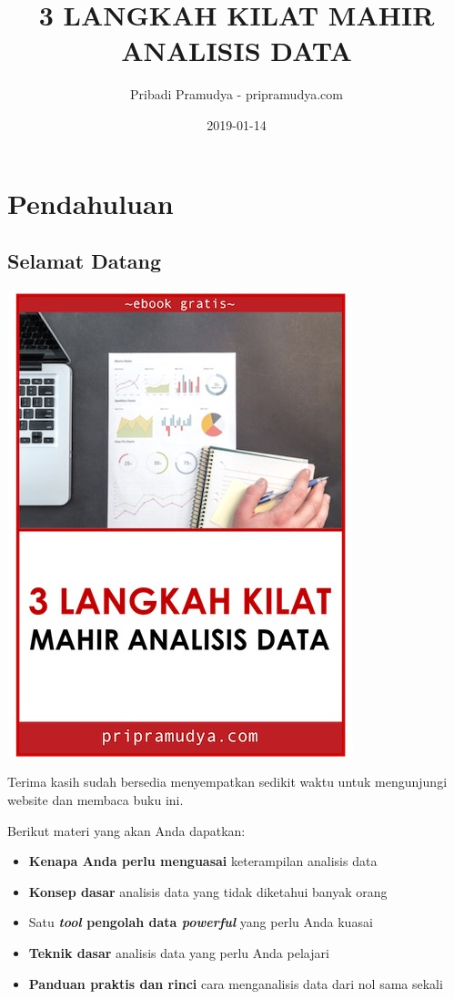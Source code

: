 \documentclass[openany]{book}
\title{3 LANGKAH KILAT MAHIR ANALISIS DATA}
\author{Pribadi Pramudya - pripramudya.com}
\date{2019-01-14}
\providecommand{\tightlist}{%
  \setlength{\itemsep}{0pt}\setlength{\parskip}{0pt}}
\begin{document}
\maketitle

{
\setcounter{tocdepth}{1}
\tableofcontents
}
\chapter*{Pendahuluan}\label{pendahuluan}

\section*{Selamat Datang}\label{selamat-datang}

\begin{center}\includegraphics[width=0.75\linewidth]{images/ebook} \end{center}

Terima kasih sudah bersedia menyempatkan sedikit waktu untuk mengunjungi
website dan membaca buku ini.

Berikut materi yang akan Anda dapatkan:

\begin{itemize}
\tightlist
\item
  \textbf{Kenapa Anda perlu menguasai} keterampilan analisis data
\item
  \textbf{Konsep dasar} analisis data yang tidak diketahui banyak orang
\item
  Satu \textbf{\emph{tool} pengolah data \emph{powerful}} yang perlu
  Anda kuasai
\item
  \textbf{Teknik dasar} analisis data yang perlu Anda pelajari
\item
  \textbf{Panduan praktis dan rinci} cara menganalisis data dari nol
  sama sekali
\end{itemize}
\end{document}

